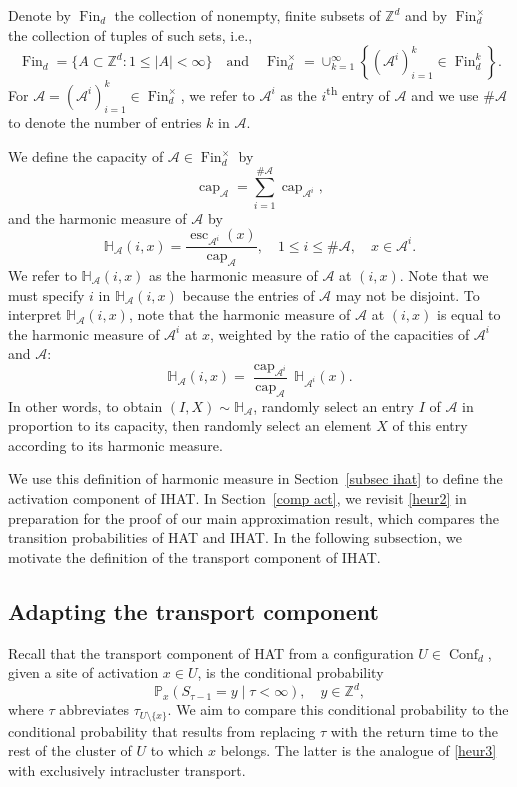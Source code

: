 \documentclass[11pt,reqno]{amsart}
\theoremstyle{definition}
\numberwithin{equation}{section}
\newcommand{\Z}{\mathbb{Z}}
\renewcommand{\P}{\mathbb{P}}
\newcommand{\1}{\mathbf{1}}
\newcommand{\A}{\mathcal{A}}
\renewcommand{\H}{\mathbb{H}}
\renewcommand{\A}{\mathcal{A}}
\DeclareMathOperator{\capac}{cap}
\DeclareMathOperator{\Es}{esc}
\DeclareMathOperator{\Conf}{\mathrm{Conf}}
\DeclareMathOperator{\Fin}{\mathrm{Fin}}
\begin{document}
Denote by $\Fin_d$ the collection of nonempty, finite subsets of $\Z^d$ and by $\Fin_d^\times$ the collection of tuples of such sets, i.e., 
\[
\Fin_d = \{A \subset \Z^d: 1 \leq |A| < \infty\} \quad \text{and} \quad \Fin_d^\times = \cup_{k=1}^\infty \left\{ (\A^i)_{i=1}^k \in \Fin_d^k \right\}.
\]
For $\A = (\A^i)_{i=1}^k \in \Fin_d^\times$, we refer to $\A^i$ as the $i$\textsuperscript{th} entry of $\A$ and we use $\# \A$ to denote the number of entries $k$ in $\A$.


We define the capacity of $\A \in \Fin_d^\times$ by
\[
\capac_\A = \sum_{i=1}^{\# \A} \capac_{\A^i},
\]
and the harmonic measure of $\A$ by 
\begin{equation}\label{ichm}
\H_\A (i,x) = \frac{\Es_{\A^i} (x)}{\capac_\A}, \quad 1 \leq i \leq \# \A, \quad x \in \A^i.
\end{equation}
We refer to $\H_\A (i,x)$ as the harmonic measure of $\A$ at $(i,x)$. Note that we must specify $i$ in $\H_\A (i,x)$ because the entries of $\A$ may not be disjoint. 
To interpret $\H_\A (i,x)$, note that the harmonic measure of $\A$ at $(i,x)$ is equal to the harmonic measure of $\A^i$ at $x$, weighted by the ratio of the capacities of $\A^i$ and $\A$:
\begin{equation}\label{hm interp}
\H_\A (i,x) = \frac{\capac_{\A^i}}{\capac_\A} \, \H_{\A^i} (x).
\end{equation}
In other words, to obtain $(I,X) \sim \H_\A$, randomly select an entry $I$ of $\A$ in proportion to its capacity, then randomly select an element $X$ of this entry according to its harmonic measure. 

We use this definition of harmonic measure in Section~\ref{subsec ihat} to define the activation component of IHAT. In Section~\ref{comp act}, we revisit \eqref{heur2} in preparation for the proof of our main approximation result, which compares the transition probabilities of HAT and IHAT. In the following subsection, we motivate the definition of the transport component of IHAT.

\subsection{Adapting the transport component}\label{subsec motivation}

Recall that the transport component of HAT from a configuration $U \in \Conf_d$, given a site of activation $x \in U$, is the conditional probability
\begin{equation}\label{heur3}
\P_x (S_{\tau-1} = y \mid \tau < \infty), \quad y \in \Z^d,
\end{equation}
where $\tau$ abbreviates $\tau_{U \setminus \{x\}}$. We aim to compare this conditional probability to the conditional probability that results from replacing $\tau$ with the return time to the rest of the cluster of $U$ to which $x$ belongs. The latter is the analogue of \eqref{heur3} with exclusively intracluster transport.
\end{document}
